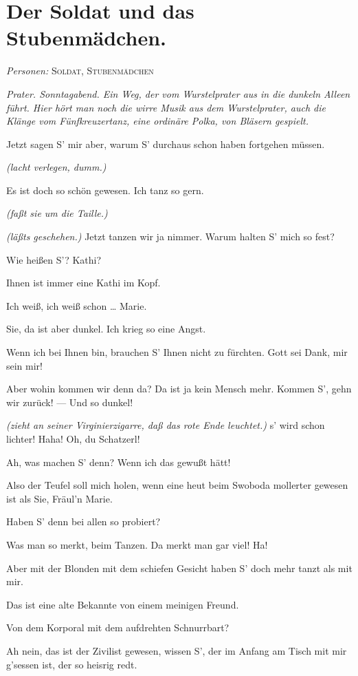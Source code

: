 \documentclass[
	final,
	a4paper,
	ngerman,
	mpinclude = true, %
	twoside = true,
	open = right,
	cleardoublepage = plain,
	DIV = 13,
	BCOR = 1cm,
	titlepage = firstiscover,
	]{scrbook}
\newcommand{\scene}{\section}
\newcommand{\direction}[1]{\textit{(#1)}}
\newcommand{\setting}[1]{\vspace{-0.5\baselineskip}\centering\textit{#1}}
\newcommand{\characterlist}[1]{{\begin{center}\textit{Personen:} #1\end{center}}}
\newcommand{\thecharacter}[1]{\textup{\textsc{#1}}}
\newcommand{\thesoldat}{\thecharacter{Soldat}}
\newcommand{\themaedchen}{\thecharacter{Stubenmädchen}}
\newcommand{\character}[1]{\item[#1:]}
\newcommand{\soldat}{\character{\thesoldat}}
\newcommand{\maedchen}{\character{\themaedchen}}
\begin{document}
\scene{Der Soldat und das Stubenmädchen.}
\characterlist{\thesoldat, \themaedchen}
\setting{Prater. Sonntagabend. Ein Weg, der vom Wurstelprater aus in die dunkeln Alleen führt. Hier hört man noch die wirre Musik aus dem Wurstelprater, auch die Klänge vom Fünfkreuzertanz, eine ordinäre Polka, von Bläsern gespielt.}
\begin{play}


	\maedchen
	Jetzt sagen S' mir aber, warum S' durchaus schon haben fortgehen müssen.

	\soldat
	\direction{lacht verlegen, dumm.}

	\maedchen
	Es ist doch so schön gewesen. Ich tanz so gern.

	\soldat
	\direction{faßt sie um die Taille.}

	\maedchen
	\direction{läßts geschehen.} Jetzt tanzen wir ja nimmer. Warum halten S' mich so fest?

	\soldat
	Wie heißen S'? Kathi?

	\maedchen
	Ihnen ist immer eine Kathi im Kopf.

	\soldat
	Ich weiß, ich weiß schon \ldots{} Marie.

	\maedchen
	Sie, da ist aber dunkel. Ich krieg so eine Angst.

	\soldat
	Wenn ich bei Ihnen bin, brauchen S' Ihnen nicht zu fürchten. Gott sei Dank, mir sein mir!

	\maedchen
	Aber wohin kommen wir denn da? Da ist ja kein Mensch mehr. Kommen S', gehn wir zurück! --- Und so dunkel!

	\soldat
	\direction{zieht an seiner Virginierzigarre, daß das rote Ende leuchtet.} s' wird schon lichter! Haha! Oh, du Schatzerl!

	\maedchen
	Ah, was machen S' denn? Wenn ich das gewußt hätt!

	\soldat
	Also der Teufel soll mich holen, wenn eine heut beim Swoboda mollerter gewesen ist als Sie, Fräul'n Marie.

	\maedchen
	Haben S' denn bei allen so probiert?

	\soldat
	Was man so merkt, beim Tanzen. Da merkt man gar viel! Ha!

	\maedchen
	Aber mit der Blonden mit dem schiefen Gesicht haben S' doch mehr tanzt als mit mir.

	\soldat
	Das ist eine alte Bekannte von einem meinigen Freund.

	\maedchen
	Von dem Korporal mit dem aufdrehten Schnurrbart?

	\soldat
	Ah nein, das ist der Zivilist gewesen, wissen S', der im Anfang am Tisch mit mir g'sessen ist, der so heisrig redt.


\end{play}
\end{document}
